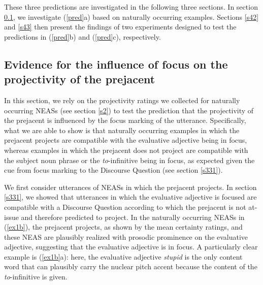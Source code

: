 \documentclass[11pt,fleqn]{article}
\newcommand{\6}{\mbox{$[\hspace*{-.6mm}[$}}
\newcommand{\9}{\mbox{$]\hspace*{-.6mm}]$}}
\begin{document}
These three predictions are investigated in the following three sections. In section \ref{s41}, we investigate (\ref{pred}a) based on naturally occurring examples. Sections \ref{s42} and \ref{s43} then present the findings of two experiments designed to test the predictions in (\ref{pred}b) and (\ref{pred}c), respectively.

\subsection{Evidence for the influence of focus on the projectivity of the prejacent}\label{s41}

In this section, we rely on the projectivity ratings we collected for naturally occurring NEASs (see section \ref{s2}) to test the prediction that the projectivity of the prejacent is influenced by the focus marking of the utterance. Specifically, what we are able to show is that naturally occurring examples in which the prejacent projects are compatible with the evaluative adjective being in focus, whereas examples in which the prejacent does not project are compatible with the subject noun phrase or the {\em to}-infinitive being in focus, as expected given the cue from focus marking to the Discourse Question (see section \ref{s331}).

We first consider utterances of NEASs in which the prejacent projects. In section \ref{s331}, we showed that utterances in which the evaluative adjective is focused are compatible with a Discourse Question according to which the prejacent is not at-issue and therefore predicted to project. In the naturally occurring NEASs in (\ref{ex1b}), the prejacent projects, as shown by the mean certainty ratings, and these NEAS are plausibly realized with prosodic prominence on the evaluative adjective, suggesting that the evaluative adjective is in focus. A particularly clear example is (\ref{ex1b}a): here, the evaluative adjective {\em stupid} is the only content word that can plausibly carry the nuclear pitch accent because the content of the {\em to}-infinitive is given.
\end{document}
